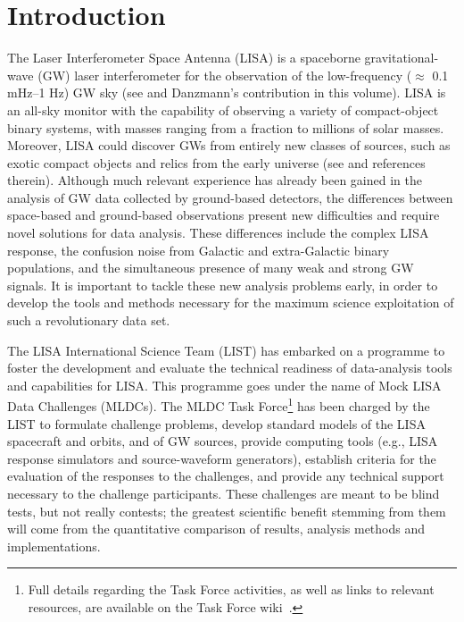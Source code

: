 \documentclass{iopart}
\begin{document}

\section{Introduction}
\label{s:intro}

The Laser Interferometer Space Antenna (LISA) is a spaceborne gravitational-wave (GW) laser interferometer for the observation of the low-frequency  ($\approx$ 0.1 mHz--1 Hz) GW sky (see \cite{ScienceCase,lisappa} and Danzmann's contribution in this volume).  LISA is an all-sky monitor with the capability of observing a variety of compact-object binary systems, with masses ranging from a fraction to millions of solar masses.  Moreover, LISA could discover GWs from entirely new classes of sources, such as exotic compact objects and relics from the early universe (see \cite{ScienceCase,CT2002} and references therein).  Although much relevant experience has already been gained in the analysis of GW data collected by ground-based detectors, the differences between space-based and ground-based observations present new difficulties and require novel solutions for data analysis. These differences include the complex LISA response, the confusion noise from Galactic and extra-Galactic binary populations, and the simultaneous presence of many weak and strong GW signals. It is important to tackle these new analysis problems early, in order to develop the tools and methods necessary for the maximum science exploitation of such a revolutionary data set.

The LISA International Science Team (LIST) has embarked on a programme to foster the development and evaluate the technical readiness of data-analysis tools and capabilities for LISA. This programme goes under the name of Mock LISA Data Challenges (MLDCs). The MLDC Task Force\footnote{Full details regarding the Task Force activities, as well as links to relevant resources, are available on the Task Force wiki~\cite{MLDCwiki}.} has been charged by the LIST to formulate challenge problems, develop standard models of the LISA spacecraft and orbits, and of GW sources, provide computing tools (e.g., LISA response simulators and source-waveform generators), establish criteria for the evaluation of the responses to the challenges, and provide any technical support necessary to the challenge participants. These challenges are meant to be blind tests, but not really contests; the greatest scientific benefit stemming from them will come from the quantitative comparison of results, analysis methods and implementations.
\end{document}
